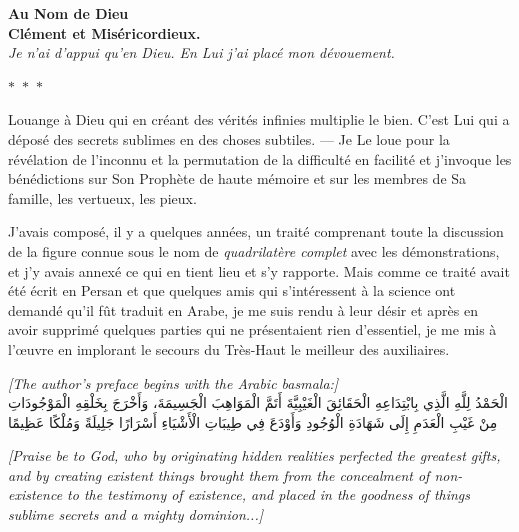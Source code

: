 \documentclass[11pt,a4paper]{article}
\theoremstyle{plain}
\theoremstyle{definition}
\theoremstyle{remark}
\newcommand{\ar}[1]{{\arabicfont\beginR #1\endR}}
\newcommand{\ornament}{\begin{center}\textcolor{goldaccent}{$\ast$~$\ast$~$\ast$}\end{center}}
\begin{document}
\begin{center}

\textbf{\Large Au Nom de Dieu}\\[0.2cm]

\textbf{\large Clément et Miséricordieux.}\\[0.3cm]

\textit{Je n'ai d'appui qu'en Dieu. En Lui j'ai placé mon dévouement.}

\end{center}



\ornament





Louange à Dieu qui en créant des vérités infinies multiplie le bien. C'est Lui qui a déposé des secrets sublimes en des choses subtiles. --- Je Le loue pour la révélation de l'inconnu et la permutation de la difficulté en facilité et j'invoque les bénédictions sur Son Prophète de haute mémoire et sur les membres de Sa famille, les vertueux, les pieux.



J'avais composé, il y a quelques années, un traité comprenant toute la discussion de la figure connue sous le nom de \textit{quadrilatère complet} avec les démonstrations, et j'y avais annexé ce qui en tient lieu et s'y rapporte. Mais comme ce traité avait été écrit en Persan et que quelques amis qui s'intéressent à la science ont demandé qu'il fût traduit en Arabe, je me suis rendu à leur désir et après en avoir supprimé quelques parties qui ne présentaient rien d'essentiel, je me mis à l'œuvre en implorant le secours du Très-Haut le meilleur des auxiliaires.





\vspace{0.5cm}

\noindent\textcolor{notecolor}{\textit{[The author's preface begins with the Arabic basmala:]}}\\

\ar{الْحَمْدُ لِلَّهِ الَّذِي بِابْتِدَاعِهِ الْحَقَائِقَ الْغَيْبِيَّةَ أَتَمَّ الْمَوَاهِبَ الْجَسِيمَةَ، وَأَخْرَجَ بِخَلْقِهِ الْمَوْجُودَاتِ مِنْ غَيْبِ الْعَدَمِ إِلَى شَهَادَةِ الْوُجُودِ وَأَوْدَعَ فِي طِيبَاتِ الْأَشْيَاءِ أَسْرَارًا جَلِيلَةً وَمُلْكًا عَظِيمًا}



\vspace{0.3cm}

\noindent\textcolor{notecolor}{\textit{[Praise be to God, who by originating hidden realities perfected the greatest gifts, and by creating existent things brought them from the concealment of non-existence to the testimony of existence, and placed in the goodness of things sublime secrets and a mighty dominion...]}}
\end{document}
